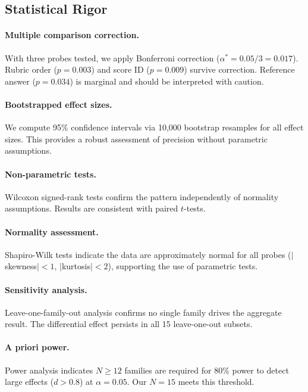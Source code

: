 \subsection{Statistical Rigor}

\paragraph{Multiple comparison correction.} With three probes tested, we apply Bonferroni correction ($\alpha^* = 0.05 / 3 = 0.017$). Rubric order ($p = 0.003$) and score ID ($p = 0.009$) survive correction. Reference answer ($p = 0.034$) is marginal and should be interpreted with caution.

\paragraph{Bootstrapped effect sizes.} We compute 95\% confidence intervals via 10,000 bootstrap resamples for all effect sizes. This provides a robust assessment of precision without parametric assumptions.

\paragraph{Non-parametric tests.} Wilcoxon signed-rank tests confirm the pattern independently of normality assumptions. Results are consistent with paired $t$-tests.

\paragraph{Normality assessment.} Shapiro-Wilk tests indicate the data are approximately normal for all probes ($|$skewness$| < 1$, $|$kurtosis$| < 2$), supporting the use of parametric tests.

\paragraph{Sensitivity analysis.} Leave-one-family-out analysis confirms no single family drives the aggregate result. The differential effect persists in all 15 leave-one-out subsets.

\paragraph{A priori power.} Power analysis indicates $N \geq 12$ families are required for 80\% power to detect large effects ($d > 0.8$) at $\alpha = 0.05$. Our $N = 15$ meets this threshold.
